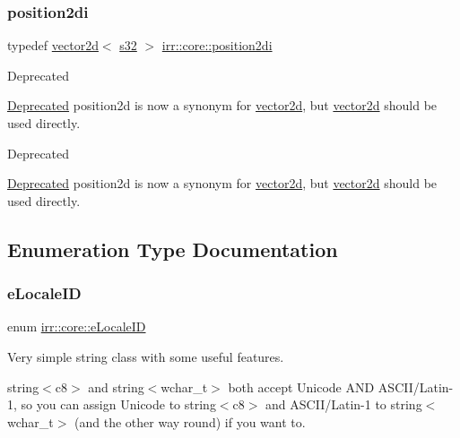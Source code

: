 \subsubsection{\texorpdfstring{position2di}{position2di}}
{\footnotesize\ttfamily typedef \hyperlink{classirr_1_1core_1_1vector2d}{vector2d}$<$ \hyperlink{namespaceirr_ac66849b7a6ed16e30ebede579f9b47c6}{s32} $>$ \hyperlink{namespaceirr_1_1core_ace0f1379db5f9f5660456ec57ab78202}{irr\+::core\+::position2di}}

\begin{DoxyRefDesc}{Deprecated}
\item[\hyperlink{deprecated__deprecated000026}{Deprecated}]position2d is now a synonym for \hyperlink{classirr_1_1core_1_1vector2d}{vector2d}, but \hyperlink{classirr_1_1core_1_1vector2d}{vector2d} should be used directly. \end{DoxyRefDesc}


\begin{DoxyRefDesc}{Deprecated}
\item[\hyperlink{deprecated__deprecated000052}{Deprecated}]position2d is now a synonym for \hyperlink{classirr_1_1core_1_1vector2d}{vector2d}, but \hyperlink{classirr_1_1core_1_1vector2d}{vector2d} should be used directly. \end{DoxyRefDesc}


\subsection{Enumeration Type Documentation}
\mbox{\label{namespaceirr_1_1core_a4682709540c80568b555acc36dbf3a4a}} 
\subsubsection{\texorpdfstring{e\+Locale\+ID}{eLocaleID}\hspace{0.1cm}{\footnotesize\ttfamily [1/2]}}
{\footnotesize\ttfamily enum \hyperlink{namespaceirr_1_1core_a4682709540c80568b555acc36dbf3a4a}{irr\+::core\+::e\+Locale\+ID}}



Very simple string class with some useful features. 

string$<$c8$>$ and string$<$wchar\+\_\+t$>$ both accept Unicode A\+ND A\+S\+C\+I\+I/\+Latin-\/1, so you can assign Unicode to string$<$c8$>$ and A\+S\+C\+I\+I/\+Latin-\/1 to string$<$wchar\+\_\+t$>$ (and the other way round) if you want to.

